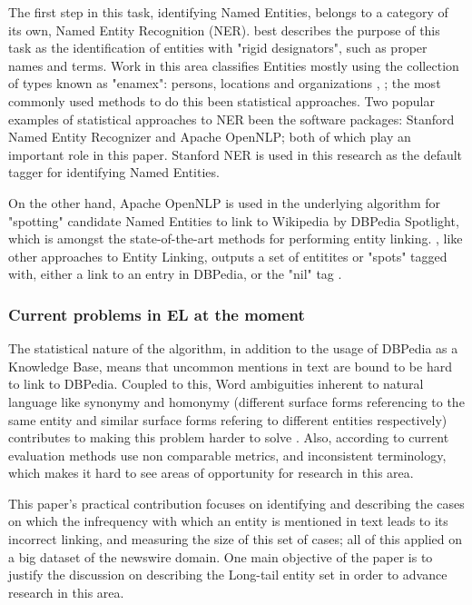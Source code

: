 The first step in this task, identifying Named Entities, belongs to a category of its own, Named Entity Recognition (NER).
\cite{rw_elo_Nadeau2009} best describes the purpose of this task as the identification of entities with "rigid designators",
such as proper names and terms. Work in this area classifies Entities mostly using the collection of types known as "enamex": persons, locations and organizations \cite{rw_elo_Nadeau2009},
; the most commonly used methods to do this been statistical approaches.
Two popular examples of statistical approaches to NER been the software packages: Stanford Named Entity Recognizer\cite{rw_elo_finkel2005} and Apache OpenNLP\cite{rw_elo_kottmann2011};
both of which play an important role in this paper. Stanford NER is used in this research as the default tagger for identifying Named Entities.

On the other hand, Apache OpenNLP is used in the underlying algorithm for "spotting" candidate Named Entities to link to Wikipedia by DBPedia Spotlight\cite{rw_elo_isem2013daiber},
which is amongst the state-of-the-art methods for performing entity linking. \cite{rw_elo_isem2013daiber}, like other approaches to Entity Linking, outputs a set of entitites or "spots" tagged with, either a link to an entry in DBPedia\cite{rw_elo_morsey2012dbpedia}, or the "nil" tag \cite{rw_elo_HACHEY2013130}. 


\subsubsection{Current problems in EL at the moment}
The statistical nature of the algorithm, in addition to the usage of DBPedia as a Knowledge Base, means that uncommon mentions in text are bound to be hard to link
to DBPedia.
Coupled to this, Word ambiguities inherent to natural language like synonymy and homonymy (different surface forms referencing to the same entity and similar surface forms refering to different entities respectively) contributes to making this problem harder to solve \cite{probabilistic}.
Also, according to \cite{framework} current evaluation methods use non comparable metrics, and inconsistent terminology, which makes it hard to see 
areas of opportunity for research in this area.

This paper's practical contribution focuses on identifying and describing the cases on which the infrequency with which an entity is mentioned in text
leads to its incorrect linking,
and measuring the size of this set of cases; all of this applied on a big dataset of the newswire domain.
One main objective of the paper is to justify the discussion on describing the Long-tail entity set in order to advance research in this area.

